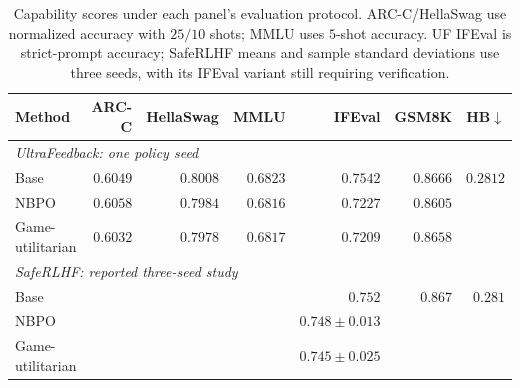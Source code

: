 \documentclass{article}
\theoremstyle{remark}
\theoremstyle{plain}
\newcommand{\pending}{\textemdash}
\begin{document}
\begin{table}[t]
\centering\scriptsize
\setlength{\tabcolsep}{4pt}
\caption{Capability scores under each panel's evaluation protocol. ARC-C/HellaSwag use normalized accuracy with $25/10$ shots; MMLU uses $5$-shot accuracy. UF IFEval is strict-prompt accuracy; SafeRLHF means and sample standard deviations use three seeds, with its IFEval variant still requiring verification.}
\label{tab:capability-complete}
\begin{tabular}{lrrrrrr}
\toprule
Method & ARC-C & HellaSwag & MMLU & IFEval & GSM8K & HB$\downarrow$\\
\midrule
\multicolumn{7}{l}{\textit{UltraFeedback: one policy seed}}\\
Base & $0.6049$ & $0.8008$ & $0.6823$ & $0.7542$ & $0.8666$ & $0.2812$\\
NBPO & $0.6058$ & $0.7984$ & $0.6816$ & $0.7227$ & $0.8605$ & \pending\\
Game-utilitarian & $0.6032$ & $0.7978$ & $0.6817$ & $0.7209$ & $0.8658$ & \pending\\
\midrule
\multicolumn{7}{l}{\textit{SafeRLHF: reported three-seed study}}\\
Base & \pending & \pending & \pending & $0.752$ & $0.867$ & $0.281$\\
NBPO & \pending & \pending & \pending & $0.748\pm0.013$ & \pending & \pending\\
Game-utilitarian & \pending & \pending & \pending & $0.745\pm0.025$ & \pending & \pending\\
\bottomrule
\end{tabular}
\end{table}
\end{document}
